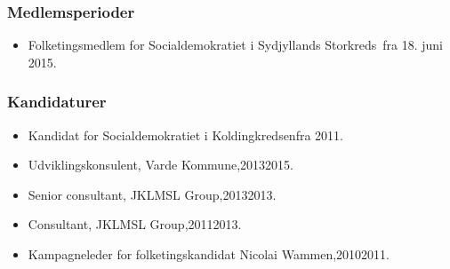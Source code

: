 \documentclass[11pt, a4paper]{awesome-cv}
\begin{document}
\begin{cvletter}
\subsubsection*{Medlemsperioder}
\begin{itemize}
\item Folketingsmedlem for Socialdemokratiet i Sydjyllands Storkreds fra 18. juni 2015.
\end{itemize}
\subsubsection*{Kandidaturer}
\begin{itemize}
\item Kandidat for Socialdemokratiet i Koldingkredsenfra 2011.
\end{itemize}
\begin{itemize}
\item Udviklingskonsulent, Varde Kommune,20132015.
\item Senior consultant, JKLMSL Group,20132013.
\item Consultant, JKLMSL Group,20112013.
\item Kampagneleder for folketingskandidat Nicolai Wammen,20102011.
\end{itemize}
\end{cvletter}
\end{document}
